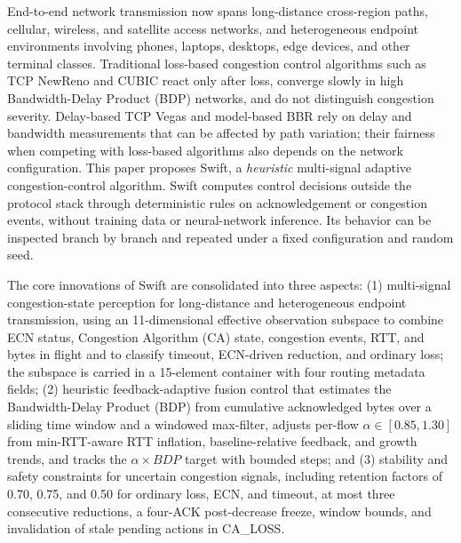 \begin{englishabstract}

End-to-end network transmission now spans long-distance cross-region paths, cellular, wireless, and satellite access networks, and heterogeneous endpoint environments involving phones, laptops, desktops, edge devices, and other terminal classes. Traditional loss-based congestion control algorithms such as TCP NewReno and CUBIC react only after loss, converge slowly in high Bandwidth-Delay Product (BDP) networks, and do not distinguish congestion severity. Delay-based TCP Vegas and model-based BBR rely on delay and bandwidth measurements that can be affected by path variation; their fairness when competing with loss-based algorithms also depends on the network configuration. This paper proposes Swift, a \emph{heuristic} multi-signal adaptive congestion-control algorithm. Swift computes control decisions outside the protocol stack through deterministic rules on acknowledgement or congestion events, without training data or neural-network inference. Its behavior can be inspected branch by branch and repeated under a fixed configuration and random seed.

The core innovations of Swift are consolidated into three aspects: (1) multi-signal congestion-state perception for long-distance and heterogeneous endpoint transmission, using an 11-dimensional effective observation subspace to combine ECN status, Congestion Algorithm (CA) state, congestion events, RTT, and bytes in flight and to classify timeout, ECN-driven reduction, and ordinary loss; the subspace is carried in a 15-element container with four routing metadata fields; (2) heuristic feedback-adaptive fusion control that estimates the Bandwidth-Delay Product (BDP) from cumulative acknowledged bytes over a sliding time window and a windowed max-filter, adjusts per-flow $\alpha\in[0.85,1.30]$ from min-RTT-aware RTT inflation, baseline-relative feedback, and growth trends, and tracks the $\alpha\times BDP$ target with bounded steps; and (3) stability and safety constraints for uncertain congestion signals, including retention factors of 0.70, 0.75, and 0.50 for ordinary loss, ECN, and timeout, at most three consecutive reductions, a four-ACK post-decrease freeze, window bounds, and invalidation of stale pending actions in CA\_LOSS.


\end{englishabstract}

